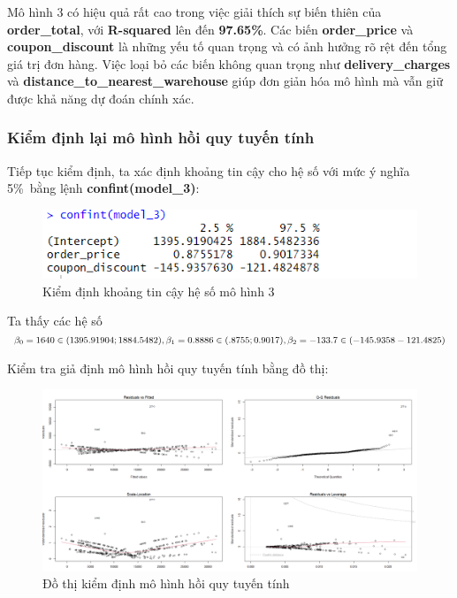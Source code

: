 Mô hình 3 có hiệu quả rất cao trong việc giải thích sự biến thiên của \textbf{order\_total}, với \textbf{R-squared} lên đến \textbf{97.65\%}. Các biến \textbf{order\_price} và \textbf{coupon\_discount} là những yếu tố quan trọng và có ảnh hưởng rõ rệt đến tổng giá trị đơn hàng. Việc loại bỏ các biến không quan trọng như \textbf{delivery\_charges} và \textbf{distance\_to\_nearest\_warehouse} giúp đơn giản hóa mô hình mà vẫn giữ được khả năng dự đoán chính xác.

\subsubsection{Kiểm định lại mô hình hồi quy tuyến tính}
Tiếp tục kiểm định, ta xác định khoảng tin cậy cho hệ số với mức ý nghĩa 5\%\ bằng lệnh \textbf{confint(model\_3)}:
\begin{figure}[ht]
  \centering
  \includegraphics[width=0.7\linewidth]{graphics/5.5.5.png}
  \caption{Kiểm định khoảng tin cậy hệ số mô hình 3 }
\end{figure}

Ta thấy các hệ số $\beta_0= 1640\in(1395.91904; 1884.5482), \beta_1= 0.8886\in(.8755;0.9017),\\ \beta_2= -133.7\in(-145.9358 -121.4825)$

Kiểm tra giả định mô hình hồi quy tuyến tính bằng đồ thị:

\begin{figure}[h]
  \centering
  \includegraphics[width=0.7\linewidth]{graphics/5.5.6.png}
  \caption{Đồ thị kiểm định mô hình hồi quy  tuyến tính }
\end{figure}

